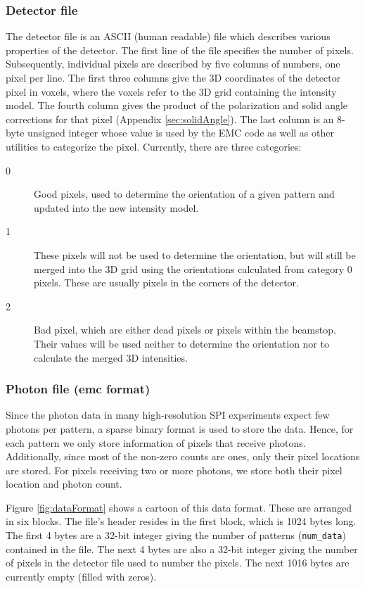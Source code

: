 \documentclass[]{iucr}              %
\begin{document}
\subsubsection{Detector file}\label{subsubsec:detector}
The detector file is an ASCII (human readable) file which describes various properties of the detector. The first line of the file specifies the number of pixels. Subsequently, individual pixels are described by five columns of numbers, one pixel per line. The first three columns give the 3D coordinates of the detector pixel in voxels, where the voxels refer to the 3D grid containing the intensity model. The fourth column gives the product of the polarization and solid angle corrections for that pixel (Appendix \ref{sec:solidAngle}). The last column is an 8-byte unsigned integer whose value is used by the EMC code as well as other utilities to categorize the pixel. Currently, there are three categories:
\begin{description}
\item[0]{Good pixels, used to determine the orientation of a given pattern and updated into the new intensity model.}
\item[1]{These pixels will not be used to determine the orientation, but will still be merged into the 3D grid using the orientations calculated from category 0 pixels. These are usually pixels in the corners of the detector.}
\item[2]{Bad pixel, which are either dead pixels or pixels within the beamstop. Their values will be used neither to determine the orientation nor to calculate the merged 3D intensities.}
\end{description}

\subsubsection{Photon file (emc format)}\label{subsubsec:emcformat}
Since the photon data in many high-resolution SPI experiments expect few photons per pattern, a sparse binary format is used to store the data. Hence, for each pattern we only store information of pixels that receive photons. Additionally, since most of the non-zero counts are ones, only their pixel locations are stored. For pixels receiving two or more photons, we store both their pixel location and photon count. 

Figure \ref{fig:dataFormat} shows a cartoon of this data format. These are arranged in six blocks. The file's header resides in the first block, which is 1024 bytes long. The first 4 bytes are a 32-bit integer giving the number of patterns (\texttt{num\_data}) contained in the file. The next 4 bytes are also a 32-bit integer giving the number of pixels in the detector file used to number the pixels. The next 1016 bytes are currently empty (filled with zeros).
\end{document}
